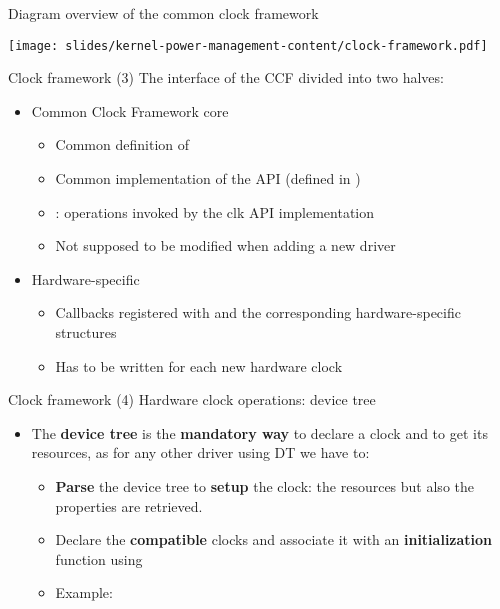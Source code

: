 \begin{frame}{Diagram overview of the common clock framework}
  \begin{center}
    \texttt{[image: slides/kernel-power-management-content/clock-framework.pdf]}
\end{center}
\end{frame}

\begin{frame}{Clock framework (3)}
  The interface of the  CCF divided into two halves:
  \begin{itemize}
  \item Common Clock Framework core
    \begin{itemize}
    \item Common definition of 
    \item Common implementation of the  API (defined in
      )
    \item {}: operations invoked by the clk API
      implementation
    \item Not supposed to be modified when adding a new driver
    \end{itemize}
  \item Hardware-specific
    \begin{itemize}
    \item Callbacks registered with  and the
      corresponding hardware-specific structures
    \item Has to be written for each new hardware clock
    \end{itemize}
  \end{itemize}
\end{frame}

\begin{frame}{Clock framework (4)}
  Hardware clock operations: device tree
  \begin{itemize}
  \item The \textbf{device tree} is the \textbf{mandatory way} to
    declare a clock and to get its resources, as for any other
    driver using DT we have to:
    \begin{itemize}
    \item \textbf{Parse} the device tree to \textbf{setup} the
      clock: the resources but also the properties are retrieved.
    \item Declare the \textbf{compatible} clocks and associate it
      with an \textbf{initialization} function using
    \item Example: 
    \end{itemize}
  \end{itemize}
\end{frame}

